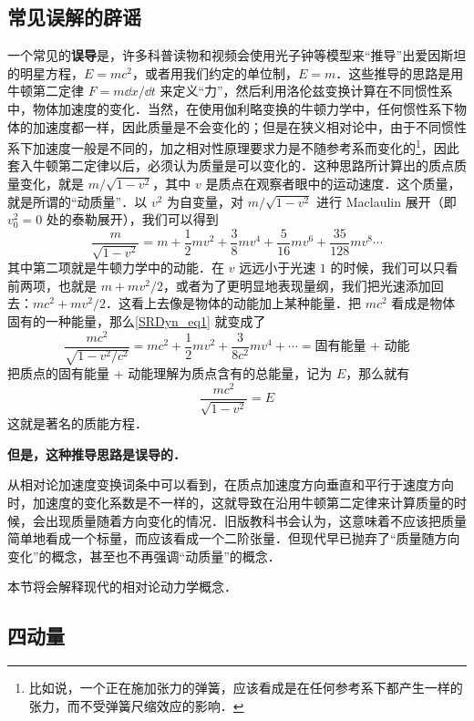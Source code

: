 \subsection{常见误解的辟谣}
一个常见的\textbf{误导}是，许多科普读物和视频会使用光子钟等模型来“推导”出爱因斯坦的明星方程，$E=mc^2$，或者用我们约定的单位制，$E=m$．这些推导的思路是用牛顿第二定律 $F=m\dd x/\dd t$ 来定义“力”，然后利用洛伦兹变换计算在不同惯性系中，物体加速度的变化．当然，在使用伽利略变换的牛顿力学中，任何惯性系下物体的加速度都一样，因此质量是不会变化的；但是在狭义相对论中，由于不同惯性系下加速度一般是不同的，加之相对性原理要求力是不随参考系而变化的\footnote{比如说，一个正在施加张力的弹簧，应该看成是在任何参考系下都产生一样的张力，而不受弹簧尺缩效应的影响．}，因此套入牛顿第二定律以后，必须认为质量是可以变化的．这种思路所计算出的质点质量变化，就是 $m/\sqrt{1-v^2}$，其中 $v$ 是质点在观察者眼中的运动速度．这个质量，就是所谓的“动质量”．以 $v^2$ 为自变量，对 $m/\sqrt{1-v^2}$ 进行 Maclaulin 展开（即 $v_0^2=0$ 处的泰勒展开），我们可以得到
\begin{equation}\label{SRDyn_eq1}
\frac{m}{\sqrt{1-v^2}} = m+\frac{1}{2}mv^2+\frac{3}{8}mv^4+\frac{5}{16}mv^6 + \frac{35}{128}mv^8\cdots
\end{equation}
其中第二项就是牛顿力学中的动能．在 $v$ 远远小于光速 $1$ 的时候，我们可以只看前两项，也就是 $m+mv^2/2$，或者为了更明显地表现量纲，我们把光速添加回去：$mc^2+mv^2/2$．这看上去像是物体的动能加上某种能量．把 $mc^2$ 看成是物体固有的一种能量，那么\autoref{SRDyn_eq1} 就变成了
\begin{equation}
\frac{mc^2}{\sqrt{1-v^2/c^2}} = mc^2+\frac{1}{2}mv^2+\frac{3}{8c^2}mv^4+\cdots=\text{固有能量 + 动能}
\end{equation}
把质点的固有能量 + 动能理解为质点含有的总能量，记为 $E$，那么就有
\begin{equation}
\frac{mc^2}{\sqrt{1-v^2}} = E
\end{equation}
这就是著名的质能方程．

\textbf{但是，这种推导思路是误导的．}


从相对论加速度变换词条中可以看到，在质点加速度方向垂直和平行于速度方向时，加速度的变化系数是不一样的，这就导致在沿用牛顿第二定律来计算质量的时候，会出现质量随着方向变化的情况．旧版教科书会认为，这意味着不应该把质量简单地看成一个标量，而应该看成一个二阶张量．但现代早已抛弃了“质量随方向变化”的概念，甚至也不再强调“动质量”的概念．

本节将会解释现代的相对论动力学概念．

\subsection{四动量}

